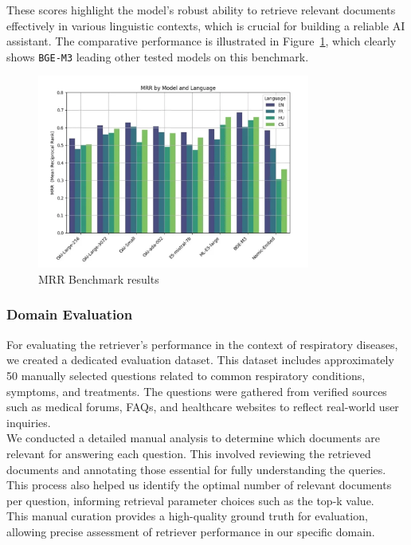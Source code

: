 These scores highlight the model's robust ability to retrieve relevant documents effectively in various linguistic contexts, which is crucial for building a reliable AI assistant. The comparative performance is illustrated in Figure~\ref{fig:mrr-benchmark}, which clearly shows \texttt{BGE-M3} leading other tested models on this benchmark.
\begin{figure}[htbp]
  \centering
  \includegraphics[width=0.8\textwidth]{images/MRR.png}
  \caption{MRR Benchmark results} %
  \label{fig:mrr-benchmark}
\end{figure}


\subsubsection{Domain Evaluation}
For evaluating the retriever’s performance in the context of respiratory diseases, we created a dedicated evaluation dataset. This dataset includes approximately 50 manually selected questions related to common respiratory conditions, symptoms, and treatments. The questions were gathered from verified sources such as medical forums, FAQs, and healthcare websites to reflect real-world user inquiries. \\
We conducted a detailed manual analysis to determine which documents are relevant for answering each question. This involved reviewing the retrieved documents and annotating those essential for fully understanding the queries. This process also helped us identify the optimal number of relevant documents per question, informing retrieval parameter choices such as the top-k value. \\
This manual curation provides a high-quality ground truth for evaluation, allowing precise assessment of retriever performance in our specific domain.

